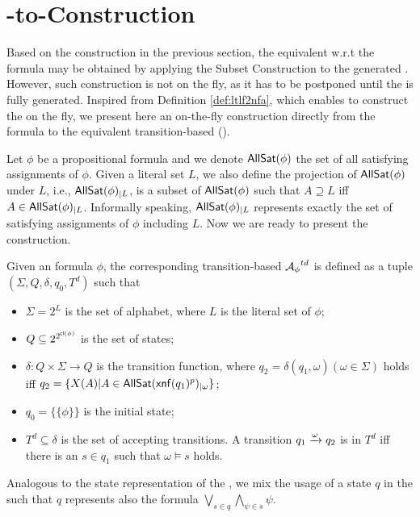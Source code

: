 \section{\ltlf-to-\DFA Construction}

Based on the \NFA construction in the previous section, the equivalent \DFA w.r.t the \ltlf formula may be obtained by applying the Subset Construction \cite{} to the generated \NFA. However, such \DFA construction is not on the fly, as it has to be postponed until the \NFA is fully generated. Inspired from Definition \ref{def:ltlf2nfa}, which enables to construct the \NFA on the fly, we present here an on-the-fly construction directly from the \ltlf formula to the equivalent transition-based \DFA (\TDFA). 

Let $\phi$ be a propositional formula and we denote ${\sf AllSat}(\phi)$ the set of all satisfying assignments of $\phi$. Given a literal set $L$, we also define the projection of ${\sf AllSat}(\phi)$ under $L$, i.e., ${\sf AllSat}(\phi)_{|L}$, is a subset of ${\sf AllSat}(\phi)$ such that $A\supseteq L$ iff $A\in {\sf AllSat}(\phi)_{|L}$. Informally speaking, ${\sf AllSat}(\phi)_{|L}$ represents exactly the set of satisfying assignments of $\phi$ including $L$. Now we are ready to present the \TDFA construction. 

\begin{definition}\label{def:ltlf2dfa}
Given an \ltlf formula $\phi$, the corresponding transition-based \DFA ${\mathcal{A}_{\phi}}^{td}$ is defined as a tuple $(\Sigma, Q, \delta, q_0, T^d)$ such that
\begin{itemize}
	\item $\Sigma = 2^{L}$ is the set of alphabet, where $L$ is the literal set of $\phi$;
	\item $Q\subseteq 2^{2^{{\sf cl}(\phi)}}$ is the set of states;
	\item $\delta:  Q \times \Sigma \to Q$ is the transition function, where $q_2 = \delta(q_1, \omega) (\omega \in \Sigma)$ holds iff $q_2=\{X(A) | A\in{\sf AllSat}({\sf xnf}(q_1)^p)_{|\omega}\}$;
	\item $q_0 = \{\{\phi \}\}$ is the initial state;
	\item $T^d\subseteq \delta$ is the set of accepting transitions. A transition $q_1\xrightarrow[]{\omega}q_2$ is in $T^d$ iff there is an $s\in q_1$ such that $\omega\models s$ holds. 
\end{itemize}

\end{definition}

Analogous to the state representation of the \TNFA, we mix the usage of a state $q$ in the \TDFA such that $q$ represents also the \ltlf formula $\bigvee_{s\in q}\bigwedge_{\psi\in s}\psi$. 

